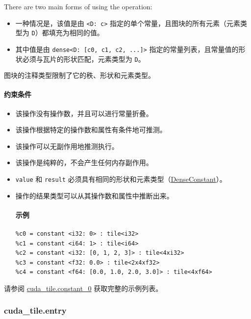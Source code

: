 \documentclass{article}
\begin{document}
There are two main forms of using the operation:


\begin{itemize}
\item 一种情况是，该值是由 \texttt{<D: c>} 指定的单个常量，且图块的所有元素（元素类型为 \texttt{D}）都填充为相同的值。
\item 其中值是由 \texttt{dense<D: [c0, c1, c2, ...]>} 指定的常量列表，且常量值的形状必须与瓦片的形状匹配，元素类型为 \texttt{D}。

\end{itemize}
图块的注释类型限制了它的秩、形状和元素类型。



\paragraph{约束条件}

\begin{itemize}
\item 该操作没有操作数，并且可以进行常量折叠。
\item 该操作根据特定的操作数和属性有条件地可推测。
\item 该操作可以无副作用地推测执行。
\item 该操作是纯粹的，不会产生任何内存副作用。
\item \texttt{value} 和 \texttt{result} 必须具有相同的形状和元素类型（\href{https://docs.nvidia.com/cuda/tile-ir/latest/sections/operations.html#type-denseconstant}{DenseConstant}）。
\item 操作的结果类型可以从其操作数和属性中推断出来。


\paragraph{示例}

\begin{lstlisting}
%c0 = constant <i32: 0> : tile<i32>
%c1 = constant <i64: 1> : tile<i64>
%c2 = constant <i32: [0, 1, 2, 3]> : tile<4xi32>
%c3 = constant <f32: 0.0> : tile<2x4xf32>
%c4 = constant <f64: [0.0, 1.0, 2.0, 3.0]> : tile<4xf64>
\end{lstlisting}

\end{itemize}
请参阅 \href{https://docs.nvidia.com/cuda/tile-ir/latest/sections/appendix.html#example-cuda-tile-constant-0}{cuda\_tile.constant\_0} 获取完整的示例列表。



\subsubsection{cuda\_tile.entry}
\end{document}
